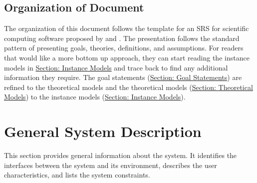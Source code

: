 \documentclass[12pt]{article}
\begin{document}
\subsection{Organization of Document}
\label{Sec:DocOrg}
The organization of this document follows the template for an SRS for scientific computing software proposed by \cite{dParnas1972} and \cite{parnasClements1984}. The presentation follows the standard pattern of presenting goals, theories, definitions, and assumptions. For readers that would like a more bottom up approach, they can start reading the instance models in \hyperref[Sec:IMs]{Section: Instance Models} and trace back to find any additional information they require.
The goal statements (\hyperref[Sec:GoalStmt]{Section: Goal Statements}) are refined to the theoretical models and the theoretical models (\hyperref[Sec:TMs]{Section: Theoretical Models}) to the instance models (\hyperref[Sec:IMs]{Section: Instance Models}).
\section{General System Description}
\label{Sec:GenSysDesc}
This section provides general information about the system. It identifies the interfaces between the system and its environment, describes the user characteristics, and lists the system constraints.
\end{document}
